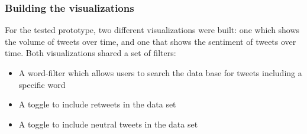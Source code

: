 \subsubsection{Building the visualizations}
For the tested prototype, two different visualizations were built: one which shows the volume of tweets over time, and one that shows the sentiment of tweets over time. Both visualizations shared a set of filters:
\begin{itemize}
    \item A word-filter which allows users to search the data base for tweets including a specific word
    \item A toggle to include retweets in the data set
    \item A toggle to include neutral tweets in the data set
\end{itemize}

